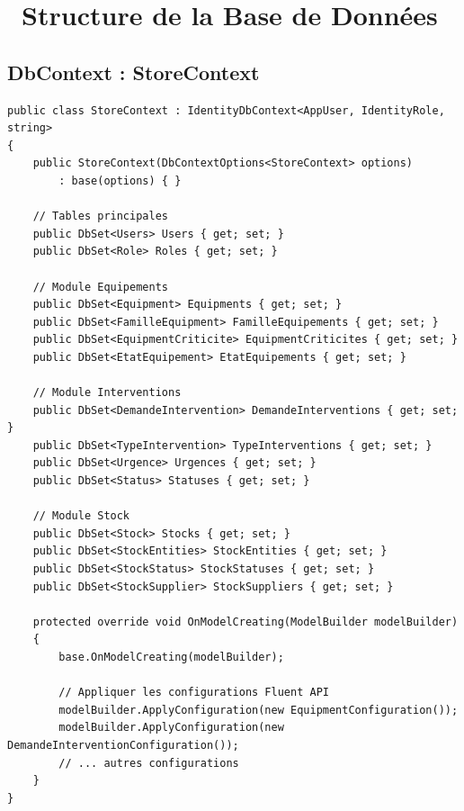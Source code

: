 \documentclass[12pt,a4paper]{article}
\begin{document}
\newpage

\section{\faDatabase\ Structure de la Base de Données}

\subsection{DbContext : StoreContext}

\begin{lstlisting}[language=CSharp, caption=Infrastructure/Data/StoreContext.cs]
public class StoreContext : IdentityDbContext<AppUser, IdentityRole, string>
{
    public StoreContext(DbContextOptions<StoreContext> options) 
        : base(options) { }
    
    // Tables principales
    public DbSet<Users> Users { get; set; }
    public DbSet<Role> Roles { get; set; }

    // Module Equipements
    public DbSet<Equipment> Equipments { get; set; }
    public DbSet<FamilleEquipment> FamilleEquipements { get; set; }
    public DbSet<EquipmentCriticite> EquipmentCriticites { get; set; }
    public DbSet<EtatEquipement> EtatEquipements { get; set; }

    // Module Interventions
    public DbSet<DemandeIntervention> DemandeInterventions { get; set; }
    public DbSet<TypeIntervention> TypeInterventions { get; set; }
    public DbSet<Urgence> Urgences { get; set; }
    public DbSet<Status> Statuses { get; set; }

    // Module Stock
    public DbSet<Stock> Stocks { get; set; }
    public DbSet<StockEntities> StockEntities { get; set; }
    public DbSet<StockStatus> StockStatuses { get; set; }
    public DbSet<StockSupplier> StockSuppliers { get; set; }

    protected override void OnModelCreating(ModelBuilder modelBuilder)
    {
        base.OnModelCreating(modelBuilder);
        
        // Appliquer les configurations Fluent API
        modelBuilder.ApplyConfiguration(new EquipmentConfiguration());
        modelBuilder.ApplyConfiguration(new DemandeInterventionConfiguration());
        // ... autres configurations
    }
}
\end{lstlisting}
\end{document}
